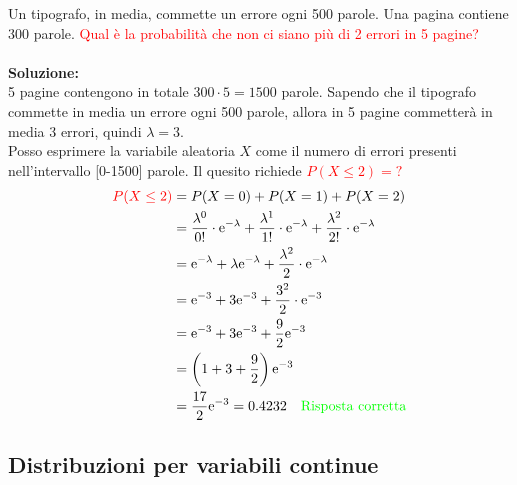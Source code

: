 \documentclass{article}  %
\theoremstyle{definition}
\begin{document}
\begin{esercizio}[Esercizio]
	Un tipografo, in media, commette un errore ogni 500 parole. Una pagina contiene 300 parole. \textcolor{red}{Qual è la probabilità che non ci siano più di 2 errori in 5 pagine?}
	\\ \\
	\textbf{Soluzione:} \\
	5 pagine contengono in totale $300 \cdot 5=1500$ parole. Sapendo che il tipografo commette in media un errore ogni 500 parole, allora in 5 pagine commetterà in media 3 errori, quindi $\lambda=3$.
	\\
	Posso esprimere la variabile aleatoria $X$ come il numero di errori presenti nell'intervallo [0-1500] parole.
	Il quesito richiede  \textcolor{red}{$P(X \leq 2)=?$} \\
	\begin{align*}
		\textcolor{red}{P(X \leq 2)}
		 & = P(X =0)+P(X =1)+P(X =2)                                                                                                                         \\
		 & = \frac{\lambda^0}{0!}\cdot \mathrm{e}^{-\lambda}+\frac{\lambda^1}{1!}\cdot \mathrm{e}^{-\lambda}+\frac{\lambda^2}{2!}\cdot \mathrm{e}^{-\lambda} \\
		 & = \mathrm{e}^{-\lambda}+\lambda\mathrm{e}^{-\lambda}+\frac{\lambda^2}{2}\cdot \mathrm{e}^{-\lambda}                                               \\
		 & = \mathrm{e}^{-3}+3\mathrm{e}^{-3}+\frac{3^2}{2}\cdot \mathrm{e}^{-3}                                                                             \\
		 & = \mathrm{e}^{-3}+3\mathrm{e}^{-3}+\frac{9}{2}\mathrm{e}^{-3}                                                                                     \\
		 & = \left(1+3+\frac{9}{2}\right)\mathrm{e}^{-3}                                                                                                     \\
		 & =\frac{17}{2}\mathrm{e}^{-3} = 0.4232 \quad \textcolor{green}{\text{Risposta corretta}}
	\end{align*}
\end{esercizio}
\subsection{Distribuzioni per variabili continue}
\end{document}
